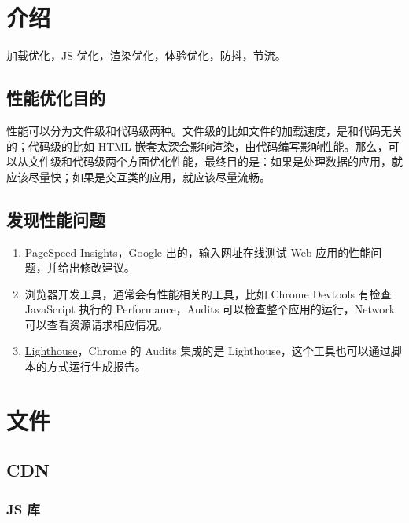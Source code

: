 \section{介绍}\label{ux4ecbux7ecd}

加载优化，JS 优化，渲染优化，体验优化，防抖，节流。

\subsection{性能优化目的}\label{ux6027ux80fdux4f18ux5316ux76eeux7684}

性能可以分为文件级和代码级两种。文件级的比如文件的加载速度，是和代码无关的；代码级的比如
HTML
嵌套太深会影响渲染，由代码编写影响性能。那么，可以从文件级和代码级两个方面优化性能，最终目的是：如果是处理数据的应用，就应该尽量快；如果是交互类的应用，就应该尽量流畅。

\subsection{发现性能问题}\label{ux53d1ux73b0ux6027ux80fdux95eeux9898}

\begin{enumerate}
\def\labelenumi{\arabic{enumi}.}
\tightlist
\item
  \href{https://developers.google.cn/speed/pagespeed/insights/}{PageSpeed
  Insights}，Google 出的，输入网址在线测试 Web
  应用的性能问题，并给出修改建议。
\item
  浏览器开发工具，通常会有性能相关的工具，比如 Chrome Devtools 有检查
  JavaScript 执行的 Performance，Audits 可以检查整个应用的运行，Network
  可以查看资源请求相应情况。
\item
  \href{https://github.com/GoogleChrome/lighthouse}{Lighthouse}，Chrome
  的 Audits 集成的是
  Lighthouse，这个工具也可以通过脚本的方式运行生成报告。
\end{enumerate}

\section{文件}\label{ux6587ux4ef6}

\subsection{CDN}\label{cdn}

\subsubsection{JS 库}\label{js-ux5e93}

